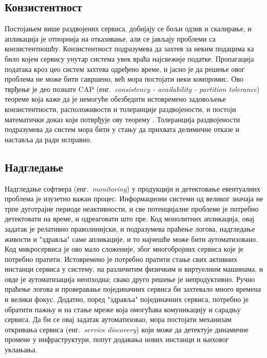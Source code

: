 \documentclass[12pt,oneside]{memoir}
\begin{document}
\subsection{Конзистентност}
Постојањем више раздвојених сервиса, добијају се бољи одзив и скалирање, и апликација је отпорнија на отказивање, али се јављају проблеми са конзистентношћу. Конзистентност подразумева да захтев за неким подацима ка било којем сервису унутар система увек враћа најсвежије податке. Пропагација података кроз цео систем захтева одређено време, и јасно је да решење овог проблема не може бити савршено, већ мора постојати неки компромис. Ово тврђење је део познате CAP (енг.~\textit{consistency - availability - partition tolerance}) теореме која каже да је немогуће обезбедити истовремено задовољење конзистентности, расположивости и толеранције раздвојености, и постоји математички доказ који потврђује ову теорему \cite{10.1145/564585.564601}. Толеранција раздвојености подразумева да систем мора бити у стању да прихвата делимичне отказе и наставља да ради исправно.

\subsection{Надгледање}
Надгледање софтвера (енг.~\textit{monitoring}) у продукцији и детектовање евентуалних проблема је изузетно важан процес. Информациони системи од великог значаја не трпе дуготрајне периоде неактивности, и све потенцијалне проблеме је потребно детектовати на време, и одреаговати што пре. Код монолитних апликација, овај задатак је релативно праволинијски, и подразумева праћење логова, надгледање живости и "здравља" саме апликације, и то најчешће може бити аутоматизовано. Код микросервиса је ово мало сложеније, због многобројних сервиса које је потребно пратити. Истовремено је потребно пратити стање свих активних инстанци сервиса у систему, на различитим физичким и виртуелним машинама, и овде је аутоматизација неопходна; свако друго решење је непродуктивно. Ручно праћење логова и проверавање појединачних сервиса би захтевало много времена и велики фокус. Додатно, поред "здравља" појединачних сервиса, потребно је обратити пажњу и на стање мреже која омогућава комуникацију и сарадњу сервиса. Да би се овај задатак аутоматизовао, мора постојати механизам откривања сервиса (енг.~\textit{service discovery}) који може да детектује динамичне промене у инфраструктури, попут додавања нових инстанци и њиховог уклањања.
\end{document}
